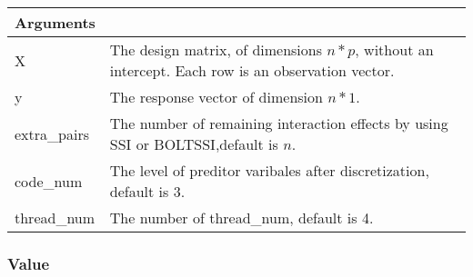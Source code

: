 \documentclass[]{article}
\begin{document}
\begin{longtable}[]{@{}ll@{}}
\toprule
\begin{minipage}[b]{0.12\columnwidth}\raggedright\strut
Arguments\strut
\end{minipage} & \begin{minipage}[b]{0.82\columnwidth}\raggedright\strut
\strut
\end{minipage}\tabularnewline
\midrule
\endhead
\begin{minipage}[t]{0.12\columnwidth}\raggedright\strut
X\strut
\end{minipage} & \begin{minipage}[t]{0.82\columnwidth}\raggedright\strut
The design matrix, of dimensions \(n*p\), without an intercept. Each row
is an observation vector.\strut
\end{minipage}\tabularnewline
\begin{minipage}[t]{0.12\columnwidth}\raggedright\strut
y\strut
\end{minipage} & \begin{minipage}[t]{0.82\columnwidth}\raggedright\strut
The response vector of dimension \(n*1\).\strut
\end{minipage}\tabularnewline
\begin{minipage}[t]{0.12\columnwidth}\raggedright\strut
extra\_pairs\strut
\end{minipage} & \begin{minipage}[t]{0.82\columnwidth}\raggedright\strut
The number of remaining interaction effects by using SSI or
BOLTSSI,default is \(n\).\strut
\end{minipage}\tabularnewline
\begin{minipage}[t]{0.12\columnwidth}\raggedright\strut
code\_num\strut
\end{minipage} & \begin{minipage}[t]{0.82\columnwidth}\raggedright\strut
The level of preditor varibales after discretization, default is
3.\strut
\end{minipage}\tabularnewline
\begin{minipage}[t]{0.12\columnwidth}\raggedright\strut
thread\_num\strut
\end{minipage} & \begin{minipage}[t]{0.82\columnwidth}\raggedright\strut
The number of thread\_num, default is 4.\strut
\end{minipage}\tabularnewline
\bottomrule
\end{longtable}

\subsubsection{Value}\label{value}
\end{document}
